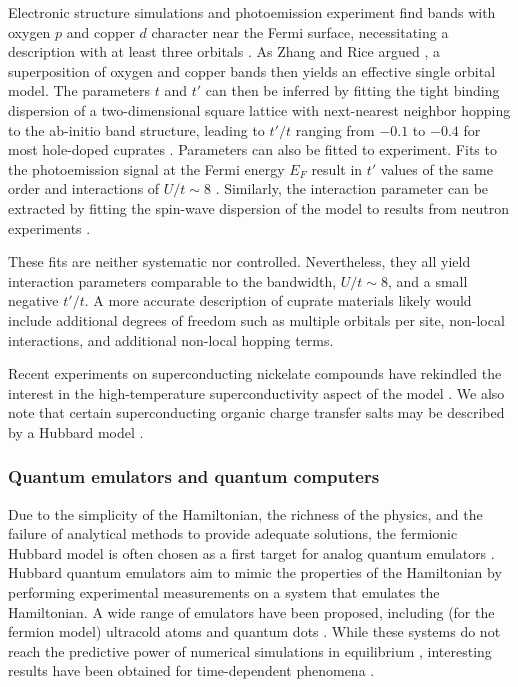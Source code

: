 \documentclass{ar-1col}
\begin{document}
Electronic structure simulations \cite{Andersen95,Pavarini01,Zheng18,Hirayama18,Hirayama19} and photoemission experiment \cite{Damascelli03} find bands with oxygen $p$ and copper $d$ character near the Fermi surface, necessitating a description with at least three orbitals \cite{Hybertsen89}. 
As Zhang and Rice argued \cite{Zhang88}, a superposition of oxygen and  copper bands then yields an effective single orbital model.  
The parameters $t$ and $t'$ can then be inferred by fitting the tight binding dispersion of a two-dimensional square lattice with next-nearest neighbor hopping to the ab-initio band structure, leading to  $t'/t$ ranging from $-0.1$ to  $-0.4$ for most hole-doped cuprates \cite{Pavarini01,Markiewicz05,Hirayama18,Hirayama19}. 
Parameters can also be fitted to experiment. Fits to the photoemission signal \cite{Damascelli03} at the Fermi energy $E_F$ result in  $t'$ values of the same order and interactions of $U/t\!\sim\!8$ \cite{Kim98}. 
Similarly, the interaction parameter can be extracted by fitting the spin-wave dispersion of the model to results from neutron experiments \cite{Coldea01}.

These fits are neither systematic nor controlled. Nevertheless, they all yield interaction parameters comparable to the bandwidth, $U/t\sim8$, and a small negative $t'/t$. A more accurate description of cuprate materials likely would include additional degrees of freedom such as multiple orbitals per site, non-local interactions, and additional non-local hopping terms.

Recent experiments on superconducting nickelate compounds have rekindled the interest in the high-temperature superconductivity aspect of the model \cite{Kitatani20}. We also note that certain superconducting organic charge transfer salts may be described by a Hubbard model \cite{Powell06}.

\subsubsection{Quantum emulators and quantum computers}
Due to the simplicity of the Hamiltonian, the richness of the physics, and the failure of analytical methods to provide adequate solutions, the fermionic Hubbard model is often chosen as a first target for analog quantum emulators \cite{Georgescu14}. Hubbard quantum emulators aim to mimic the properties of the Hamiltonian by performing experimental measurements on a system that emulates the Hamiltonian. A wide range of emulators have been proposed, including (for the fermion model) ultracold atoms \cite{Mazurenko17} and quantum dots \cite{Byrnes08,Singha11,Hensgens17}. While these systems do not reach the predictive power of numerical simulations in equilibrium \cite{LeBlanc15,Schaefer21A}, interesting results have been obtained for time-dependent phenomena \cite{Schneider12,White19}.
\end{document}
